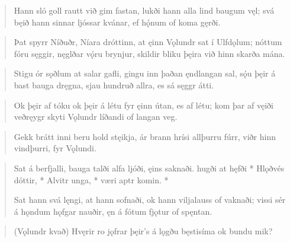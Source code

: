 
\begin{verse}
\bva Hann sló goll rautt
við gim fastan,
lukði hann alla
lind baugum vęl;
svá bęið hann
sinnar ljóssar
kvánar, ef hǫ́num
of koma gęrði.\\%
\end{verse}


\begin{verse}
\bva Þat spyrr Níðuðr,
Níara dróttinn,
at ęinn Vǫlundr
sat í Ulfdǫlum;
nóttum fóru sęggir,
nęglðar vǫ́ru brynjur,
skildir bliku þęira
við hinn skarða mána.\\%
\end{verse}


\begin{verse}
\bva Stigu ór sǫðlum
at salar gafli,
gingu inn þaðan
ęndlangan sal,
sǫ́u þęir á bast
bauga dręgna,
sjau hundruð allra,
es sá sęggr átti.\\%
\end{verse}


\begin{verse}
\bva Ok þęir af tóku
ok þęir á létu
fyr ęinn útan,
es af létu;
kom þar af vęiði
veðręygr skyti
Vǫlundr líðandi
of langan veg.\\%
\end{verse}


\begin{verse}
\bva Gekk brátt inni
beru hold stęikja,
ár brann hrísi
allþurru fúrr,
viðr hinn vindþurri,
fyr Vǫlundi.\\%
\end{verse}


\begin{verse}
\bva Sat á berfjalli,
bauga talði
alfa ljóði,
ęins saknaði.
hugði at hęfði *
Hlǫðvés dóttir, *
Alvitr unga, *
væri aptr komin. *
 

Sat hann svá lęngi,
at hann sofnaði,
ok hann viljalauss
of vaknaði;
vissi sér á hǫndum
hǫfgar nauðir,
ęn á fótum
fjǫtur of spęntan.\\%
\end{verse}


\begin{verse}
\bva (Vǫlundr kvað)
Hvęrir ro jǫfrar
þęir's á lǫgðu
bęstisíma
ok bundu mik?\\%
\end{verse}

